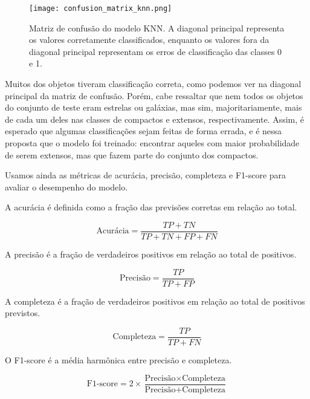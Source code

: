 \begin{figure}[!ht]
    \centering
    \texttt{[image: confusion\_matrix\_knn.png]}
    \caption[]{Matriz de confusão do modelo KNN. A diagonal principal representa os valores corretamente classificados, enquanto os valores fora da diagonal principal representam os erros de classificação das classes 0 e 1.}
    \label{confusion_matrix_knn}
\end{figure}

Muitos dos objetos tiveram classificação correta, como podemos ver na diagonal principal da matriz de confusão. Porém, cabe ressaltar que nem todos os objetos do conjunto de teste eram estrelas ou galáxias, mas sim, majoritariamente, mais de cada um deles nas classes de compactos e extensos, respectivamente. Assim, é esperado que algumas classificações sejam feitas de forma errada, e é nessa proposta que o modelo foi treinado: encontrar aqueles com maior probabilidade de serem extensos, mas que fazem parte do conjunto dos compactos.

Usamos ainda as métricas de acurácia, precisão, completeza e F1-score para avaliar o desempenho do modelo.

A acurácia é definida como a fração das previsões corretas em relação ao total. 

\begin{equation}
    \text{Acurácia} = \frac{TP + TN}{TP + TN + FP + FN}
\end{equation}

A precisão é a fração de verdadeiros positivos em relação ao total de positivos. 

\begin{equation}
    \text{Precisão} = \frac{TP}{TP + FP}
    \label{eq:precisao}
\end{equation}

A completeza é a fração de verdadeiros positivos em relação ao total de positivos previstos.

\begin{equation}
    \text{Completeza} = \frac{TP}{TP + FN}
    \label{eq:completeza}
\end{equation}

O F1-score é a média harmônica entre precisão e completeza.

\begin{equation}
    \text{F1-score} = 2 \times \frac{\text{Precisão} \times \text{Completeza}}{\text{Precisão} + \text{Completeza}}
\end{equation}

